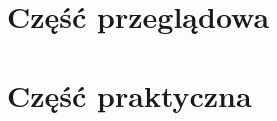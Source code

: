 \documentclass[12pt]{bsc}
\begin{document}
  
  \tableofcontents
  
  
  
  \part{Część przeglądowa}  
  

  \part{Część praktyczna}
  
  
  

  \pagestyle{plain}
  
  
  

  
  
  
  
  
  
  
\end{document}

